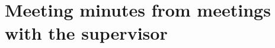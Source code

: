 \chapter{Meeting minutes from meetings with the supervisor}
\newpage

\newpage

\newpage

\newpage

\newpage

\newpage

\newpage

\newpage

\newpage

\newpage

\newpage
